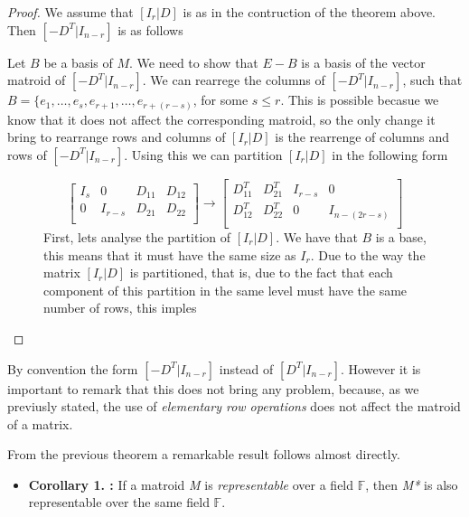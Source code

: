 \begin{proof}
    We assume that $[I_r|D]$ is as in the contruction of the theorem above. Then $[-D^T|I_{n-r}]$ is as follows


    Let $B$ be a basis of $M$. We need to show that $E-B$ is a basis of the vector matroid of $[-D^T|I_{n-r}]$. We can rearrege the columns of $[-D^T|I_{n-r}]$, such that $B=\{e_1,\dots,e_s, e_{r+1}, \dots , e_{r+(r-s)}$, for some $s \leq r$. This is possible becasue we know that it does not affect the corresponding matroid, so the only change it bring to rearrange rows and columns of $[I_r|D]$ is the rearrenge of columns and rows of $[-D^T|I_{n-r}]$. 
    Using this we can partition $[I_r|D]$ in the following form

    \begin{figure}
    $$\begin{bmatrix}
    I_s & 0 & D_11 & D_12\\
    0 & I_{r-s} & D_21 & D_22\\
    \end{bmatrix}
    \rightarrow
    \begin{bmatrix}
    D_11^T & D_21^T & I_{r-s} & 0\\
    D_12^T & D_22^T & 0 & I_{n-(2r-s)}\\
    \end{bmatrix}$$
    First, lets analyse the partition of $[I_r|D]$.
    We have that $B$ is a base, this means that it must have the same size as $I_r$. Due to the way the matrix $[I_r|D]$ is partitioned, that is, due to the fact that each component of this partition in the same level must have the same number of rows, this imples 
    
\end{figure}
    
\end{proof}

By convention the form $[−D^T |I_{n−r}]$ instead of $[D^T |I_{n−r}]$. However it is important to remark that this does not bring any problem, because, as we previusly stated, the use of \textit{elementary row operations} does not affect the matroid of a matrix. 

From the previous theorem a remarkable result follows almost directly. 
\begin{itemize}
    \item  \textbf{Corollary 1. :} If a matroid \textit{M} is \textit{representable} over a field $\mathbb{F}$, then \textit{M*} is also representable over the same field $\mathbb{F}$.
\end{itemize}


